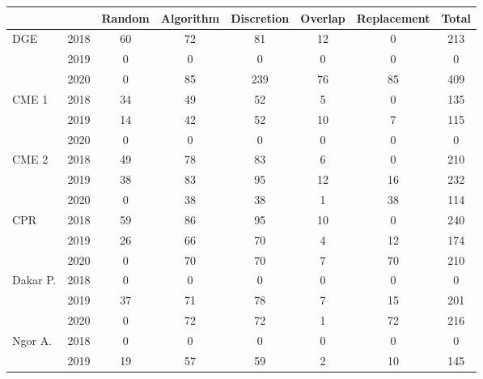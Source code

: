\begin{tabular}{llcccccc}
            &    & Random&   Algorithm&  Discretion&     Overlap& Replacement&       Total\\
\hline
\multirow{3}{*}{DGE} & 2018&          60&          72&          81&          12&           0&         213\\
& 2019      &           0&           0&           0&           0&           0&           0\\
& 2020      &           0&          85&         239&          76&          85&         409\\
\hline \multirow{3}{*}{CME 1} & 2018&          34&          49&          52&           5&           0&         135\\
& 2019      &          14&          42&          52&          10&           7&         115\\
& 2020      &           0&           0&           0&           0&           0&           0\\
\hline \multirow{3}{*}{CME 2} & 2018&          49&          78&          83&           6&           0&         210\\
& 2019      &          38&          83&          95&          12&          16&         232\\
& 2020      &           0&          38&          38&           1&          38&         114\\
\hline \multirow{3}{*}{CPR} & 2018&          59&          86&          95&          10&           0&         240\\
& 2019      &          26&          66&          70&           4&          12&         174\\
& 2020      &           0&          70&          70&           7&          70&         210\\
\hline \multirow{3}{*}{Dakar P.} & 2018&           0&           0&           0&           0&           0&           0\\
& 2019      &          37&          71&          78&           7&          15&         201\\
& 2020      &           0&          72&          72&           1&          72&         216\\
\hline \multirow{3}{*}{Ngor A.} & 2018&           0&           0&           0&           0&           0&           0\\
& 2019      &          19&          57&          59&           2&          10&         145\\

\end{tabular}
